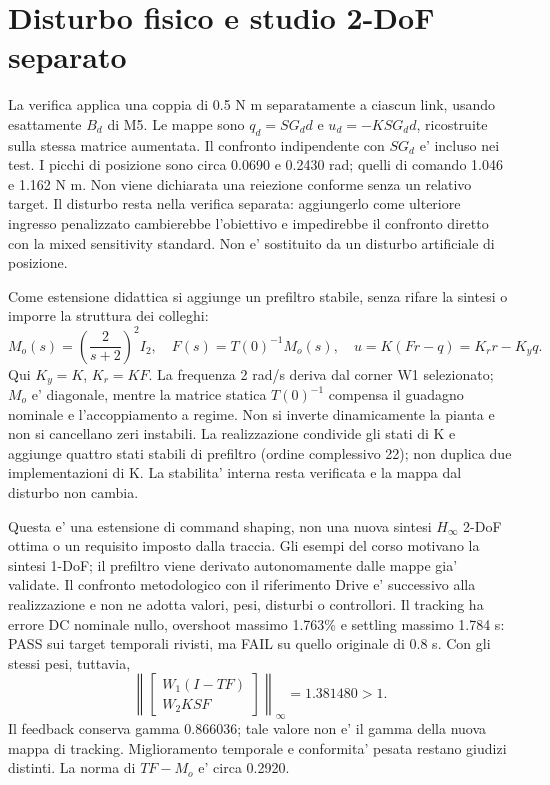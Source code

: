 \section{Disturbo fisico e studio 2-DoF separato}
La verifica applica una coppia di 0.5 N m separatamente a ciascun link,
usando esattamente $B_d$ di M5. Le mappe sono $q_d=SG_d d$ e
$u_d=-KSG_d d$, ricostruite sulla stessa matrice aumentata.
Il confronto indipendente con $SG_d$ e' incluso nei test.
I picchi di posizione sono circa 0.0690 e 0.2430 rad; quelli di comando
1.046 e 1.162 N m. Non viene dichiarata una reiezione conforme senza
un relativo target. Il disturbo resta nella verifica separata:
aggiungerlo come ulteriore ingresso penalizzato cambierebbe l'obiettivo
e impedirebbe il confronto diretto con la mixed sensitivity standard.
Non e' sostituito da un disturbo artificiale di posizione.

Come estensione didattica si aggiunge un prefiltro stabile, senza
rifare la sintesi o imporre la struttura dei colleghi:
\[
M_o(s)=\left(\frac{2}{s+2}\right)^2 I_2,\quad
F(s)=T(0)^{-1}M_o(s),\quad
u=K(F r-q)=K_r r-K_y q.
\]
Qui $K_y=K$, $K_r=KF$. La frequenza 2 rad/s deriva dal corner W1
selezionato; $M_o$ e' diagonale, mentre la matrice statica $T(0)^{-1}$
compensa il guadagno nominale e l'accoppiamento a regime.
Non si inverte dinamicamente la pianta e non si cancellano zeri instabili.
La realizzazione condivide gli stati di K e aggiunge quattro stati stabili
di prefiltro (ordine complessivo 22); non duplica due implementazioni di K.
La stabilita' interna resta verificata e la mappa dal disturbo non cambia.

Questa e' una estensione di command shaping, non una nuova sintesi
$H_\infty$ 2-DoF ottima o un requisito imposto dalla traccia.
Gli esempi del corso motivano la sintesi 1-DoF; il prefiltro viene
derivato autonomamente dalle mappe gia' validate. Il confronto metodologico
con il riferimento Drive e' successivo alla realizzazione e non ne
adotta valori, pesi, disturbi o controllori.
Il tracking ha errore DC nominale nullo, overshoot massimo 1.763\%
e settling massimo 1.784 s: PASS sui target temporali rivisti, ma
FAIL su quello originale di 0.8 s. Con gli stessi pesi, tuttavia,
\[
\left\|\begin{bmatrix}W_1(I-TF)\\W_2KSF\end{bmatrix}\right\|_\infty
=1.381480>1.
\]
Il feedback conserva gamma 0.866036; tale valore non e' il gamma della
nuova mappa di tracking. Miglioramento temporale e conformita' pesata
restano giudizi distinti. La norma di $TF-M_o$ e' circa 0.2920.

